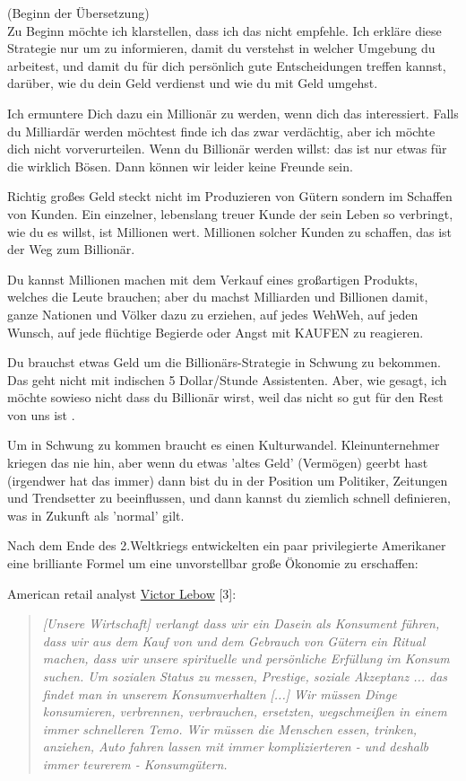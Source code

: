 \documentclass[10pt,a4paper,ngerman,twoside]{article} %
\begin{document}
(Beginn der Übersetzung) \\


Zu Beginn möchte ich klarstellen, dass ich das nicht empfehle. Ich erkläre diese Strategie nur um zu informieren, damit du verstehst in welcher Umgebung du arbeitest, und damit du für dich persönlich gute Entscheidungen treffen kannst, darüber, wie du dein Geld verdienst und wie du mit Geld umgehst.

Ich ermuntere Dich dazu ein Millionär zu werden, wenn dich das interessiert. Falls du Milliardär werden möchtest finde ich das zwar verdächtig, aber ich möchte dich nicht vorverurteilen. Wenn du Billionär werden willst: das ist nur etwas für die wirklich Bösen. Dann können wir leider keine Freunde sein.

Richtig großes Geld steckt nicht im Produzieren von Gütern sondern im Schaffen von Kunden. Ein einzelner, lebenslang treuer Kunde der sein Leben so verbringt, wie du es willst, ist Millionen wert. Millionen solcher Kunden zu schaffen, das ist der Weg zum Billionär.

Du kannst Millionen machen mit dem Verkauf eines großartigen Produkts, welches die Leute brauchen; aber du machst Milliarden und Billionen damit, ganze Nationen und Völker dazu zu erziehen, auf jedes WehWeh, auf jeden Wunsch, auf jede flüchtige Begierde oder Angst mit KAUFEN zu reagieren.

Du brauchst etwas Geld um die Billionärs-Strategie in Schwung zu bekommen. Das geht nicht mit indischen 5 Dollar/Stunde Assistenten. Aber, wie gesagt, ich  möchte sowieso nicht dass du Billionär wirst, weil das nicht so gut für den Rest von uns ist .

Um in Schwung zu kommen braucht es einen Kulturwandel. Kleinunternehmer kriegen das nie hin, aber wenn du etwas 'altes Geld' (Vermögen) geerbt hast (irgendwer hat das immer) dann bist du in der Position um Politiker, Zeitungen und Trendsetter zu beeinflussen, und dann kannst du ziemlich schnell definieren, was in Zukunft als 'normal' gilt.

Nach dem Ende des 2.Weltkriegs entwickelten ein paar privilegierte Amerikaner eine brilliante Formel um eine unvorstellbar große Ökonomie zu erschaffen:


American retail analyst \href{https://en.wikipedia.org/wiki/Victor_Lebow}{Victor Lebow} [3]:
\begin{quote}
\textit{
[Unsere Wirtschaft] verlangt dass wir ein Dasein als Konsument führen, dass wir aus dem Kauf von und dem Gebrauch von Gütern ein Ritual machen, dass wir unsere spirituelle und persönliche Erfüllung im Konsum suchen. Um sozialen Status zu messen, Prestige, soziale Akzeptanz ... das findet man in unserem Konsumverhalten [...] Wir müssen Dinge konsumieren, verbrennen, verbrauchen, ersetzten, wegschmeißen in einem immer schnelleren Temo. Wir müssen die Menschen essen, trinken, anziehen, Auto fahren lassen mit immer komplizierteren - und deshalb immer teurerem -  Konsumgütern.}
\end{quote} 
\end{document}
